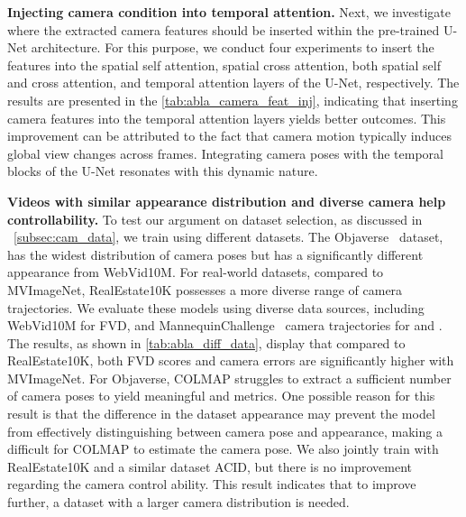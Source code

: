 \noindent \textbf{Injecting camera condition into temporal attention.} 
Next, we investigate where the extracted camera features should be inserted within the pre-trained U-Net architecture. 
%
For this purpose, we conduct four experiments to insert the features into the spatial self attention, spatial cross attention, both spatial self and cross attention, and temporal attention layers of the U-Net, respectively.
%
The results are presented in the \cref{tab:abla_camera_feat_inj}, indicating that inserting camera features into the temporal attention layers yields better outcomes. 
%
This improvement can be attributed to the fact that camera motion typically induces global view changes across frames.
%
Integrating camera poses with the temporal blocks of the U-Net resonates with this dynamic nature.

\noindent \textbf{Videos with similar appearance distribution and diverse camera help controllability.}
To test our argument on dataset selection, as discussed in ~\cref{subsec:cam_data}, we train \method using different datasets.
%
The Objaverse~\citep{objaverse} dataset, has the widest distribution of camera poses but has a significantly different appearance from WebVid10M. 
%
For real-world datasets, compared to MVImageNet, RealEstate10K possesses a more diverse range of camera trajectories. 
%
We evaluate these models using diverse data sources, including WebVid10M for FVD, and MannequinChallenge~\citep{MannequinChallenge} camera trajectories for \te and \rote.
%
The results, as shown in \cref{tab:abla_diff_data}, display that compared to RealEstate10K, both FVD scores and camera errors are significantly higher with MVImageNet.
%
For Objaverse, COLMAP struggles to extract a sufficient number of camera poses to yield meaningful \te and \rote metrics.
%
One possible reason for this result is that the difference in the dataset appearance may prevent the model from effectively distinguishing between camera pose and appearance, making a difficult for COLMAP to estimate the camera pose.
%
We also jointly train \method with RealEstate10K and a similar dataset ACID, but there is no improvement regarding the camera control ability.
%
This result indicates that to improve \method further, a dataset with a larger camera distribution is needed.

